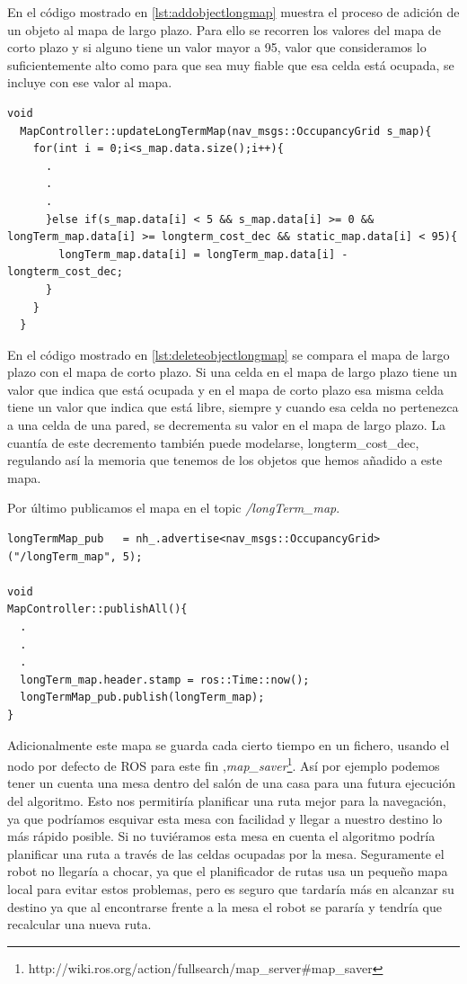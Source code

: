 En el código mostrado en \ref{lst:addobjectlongmap} muestra el proceso de adición de un objeto al mapa de largo plazo. Para ello se recorren los valores del mapa de corto plazo y si alguno tiene un valor mayor a 95, valor que consideramos lo suficientemente alto como para que sea muy fiable que esa celda está ocupada, se incluye con ese valor al mapa.

\begin{lstlisting}[caption=Procedimiento para eliminar un objeto al mapa de largo plazo, label={lst:deleteobjectlongmap}]
  void
  MapController::updateLongTermMap(nav_msgs::OccupancyGrid s_map){
    for(int i = 0;i<s_map.data.size();i++){
      .
      .
      .
      }else if(s_map.data[i] < 5 && s_map.data[i] >= 0 && longTerm_map.data[i] >= longterm_cost_dec && static_map.data[i] < 95){
        longTerm_map.data[i] = longTerm_map.data[i] - longterm_cost_dec;
      }
    }
  } 

\end{lstlisting}

En el código mostrado en \ref{lst:deleteobjectlongmap} se compara el mapa de largo plazo con el mapa de corto plazo. Si una celda en el mapa de largo plazo tiene un valor que indica que está ocupada y en el mapa de corto plazo esa misma celda tiene un valor que indica que está libre, siempre y cuando esa celda no pertenezca a una celda de una pared, se decrementa su valor en el mapa de largo plazo. La cuantía de este decremento también puede modelarse, longterm\_cost\_dec, regulando así la memoria que tenemos de los objetos que hemos añadido a este mapa.\pagebreak

Por último publicamos el mapa en el topic \textit{/longTerm\_map}.

\begin{lstlisting}[caption=Publicación del mapa de largo plazo, label={lst:longmappublish}]
longTermMap_pub   = nh_.advertise<nav_msgs::OccupancyGrid>("/longTerm_map", 5); 

void
MapController::publishAll(){
  .
  .
  .
  longTerm_map.header.stamp = ros::Time::now();
  longTermMap_pub.publish(longTerm_map);
}
\end{lstlisting}


Adicionalmente este mapa se guarda cada cierto tiempo en un fichero, usando el nodo por defecto de ROS para este fin ,\textit{map\_saver}\footnote{http://wiki.ros.org/action/fullsearch/map\_server\#map\_saver}. Así por ejemplo podemos tener un cuenta una mesa dentro del salón de una casa para una futura ejecución del algoritmo. Esto nos permitiría planificar una ruta mejor para la navegación, ya que podríamos esquivar esta mesa con facilidad y llegar a nuestro destino lo más rápido posible. Si no tuviéramos esta mesa en cuenta el algoritmo podría planificar una ruta a través de las celdas ocupadas por la mesa. Seguramente el robot no llegaría a chocar, ya que el planificador de rutas usa un pequeño mapa local para evitar estos problemas, pero es seguro que tardaría más en alcanzar su destino ya que al encontrarse frente a la mesa el robot se pararía y tendría que recalcular una nueva ruta. 



